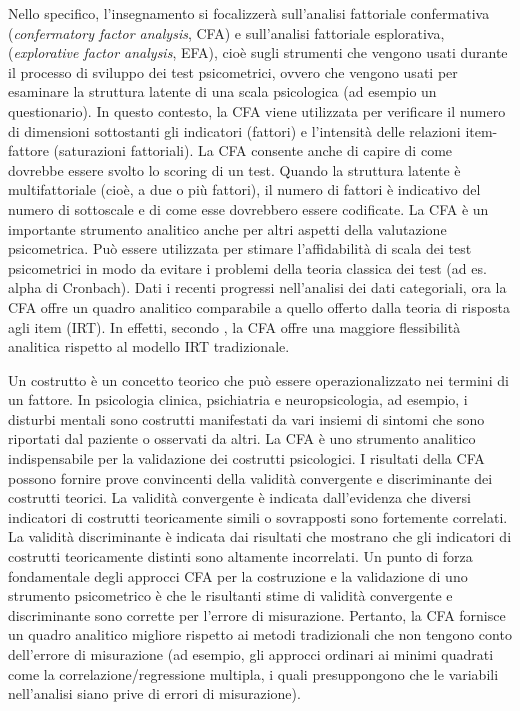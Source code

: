 \documentclass[
  11pt,
]{krantz}
\begin{document}
Nello specifico, l'insegnamento si focalizzerà sull'analisi fattoriale confermativa (\emph{confermatory factor analysis}, CFA) e sull'analisi fattoriale esplorativa, (\emph{explorative factor analysis}, EFA), cioè sugli strumenti che vengono usati durante il processo di sviluppo dei test psicometrici, ovvero che vengono usati per esaminare la struttura latente di una scala psicologica (ad esempio un questionario). In questo contesto, la CFA viene utilizzata per verificare il numero di dimensioni sottostanti gli indicatori (fattori) e l'intensità delle relazioni item-fattore (saturazioni fattoriali). La CFA consente anche di capire di come dovrebbe essere svolto lo scoring di un test. Quando la struttura latente è multifattoriale (cioè, a due o più fattori), il numero di fattori è indicativo del numero di sottoscale e di come esse dovrebbero essere codificate. La CFA è un importante strumento analitico anche per altri aspetti della valutazione psicometrica. Può essere utilizzata per stimare l'affidabilità di scala dei test psicometrici in modo da evitare i problemi della teoria classica dei test (ad es. alpha di Cronbach). Dati i recenti progressi nell'analisi dei dati categoriali, ora la CFA offre un quadro analitico comparabile a quello offerto dalla teoria di risposta agli item (IRT). In effetti, secondo \citet{brown2015confirmatory}, la CFA offre una maggiore flessibilità analitica rispetto al modello IRT tradizionale.

Un costrutto è un concetto teorico che può essere operazionalizzato nei termini di un fattore. In psicologia clinica, psichiatria e neuropsicologia, ad esempio, i disturbi mentali sono costrutti manifestati da vari insiemi di sintomi che sono riportati dal paziente o osservati da altri. La CFA è uno strumento analitico indispensabile per la validazione dei costrutti psicologici. I risultati della CFA possono fornire prove convincenti della validità convergente e discriminante dei costrutti teorici. La validità convergente è indicata dall'evidenza che diversi indicatori di costrutti teoricamente simili o sovrapposti sono fortemente correlati. La validità discriminante è indicata dai risultati che mostrano che gli indicatori di costrutti teoricamente distinti sono altamente incorrelati. Un punto di forza fondamentale degli approcci CFA per la costruzione e la validazione di uno strumento psicometrico è che le risultanti stime di validità convergente e discriminante sono corrette per l'errore di misurazione. Pertanto, la CFA fornisce un quadro analitico migliore rispetto ai metodi tradizionali che non tengono conto dell'errore di misurazione (ad esempio, gli approcci ordinari ai minimi quadrati come la correlazione/regressione multipla, i quali presuppongono che le variabili nell'analisi siano prive di errori di misurazione).
\end{document}
